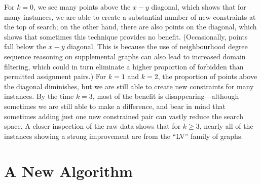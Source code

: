 \documentclass[letterpaper]{article}
\theoremstyle{definition}
\begin{document}
For $k = 0$, we see many points above the $x-y$ diagonal, which shows that for many instances, we
are able to create a substantial number of new constraints at the top of search; on the other hand,
there are also points on the diagonal, which shows that sometimes this technique provides no
benefit. (Occasionally, points fall below the $x-y$ diagonal.  This is because the use of
neighbourhood degree sequence reasoning on supplemental graphs can also lead to increased domain
filtering, which could in turn eliminate a higher proportion of forbidden than permitted assignment
pairs.) For $k = 1$ and $k = 2$, the proportion of points above the diagonal diminishes, but we are
still able to create new constraints for many instances. By the time $k = 3$, most of the benefit is
disappearing---although sometimes we are still able to make a difference, and bear in mind that
sometimes adding just one new constrained pair can vastly reduce the search space.  A closer
inspection of the raw data shows that for $k \ge 3$, nearly all of the instances showing a strong
improvement are from the ``LV'' family of graphs.

\section{A New Algorithm}\label{section:algorithm}
\end{document}
